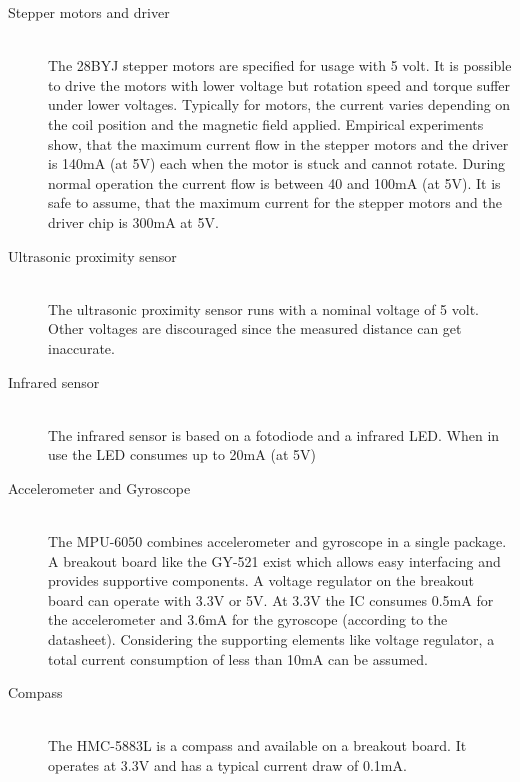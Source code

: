 \documentclass[11pt,a4paper]{article}
\begin{document}
\begin{description}
\item[Stepper motors and driver] \hfill \\ The 28BYJ stepper motors are specified for usage with 5 volt. It is possible to drive the motors with lower voltage but rotation speed and torque suffer under lower voltages. Typically for motors, the current varies depending on the coil position and the magnetic field applied. Empirical experiments show, that the maximum current flow in the stepper motors and the driver is 140mA (at 5V) each when the motor is stuck and cannot rotate. During normal operation the current flow is between 40 and 100mA (at 5V). It is safe to assume, that the maximum current for the stepper motors and the driver chip is 300mA at 5V.
\item[Ultrasonic proximity sensor] \hfill \\ The ultrasonic proximity sensor runs with a nominal voltage of 5 volt. Other voltages are discouraged since the measured distance can get inaccurate. 
\item[Infrared sensor] \hfill \\ The infrared sensor is based on a fotodiode and a infrared LED. When in use the LED consumes up to 20mA (at 5V) 
\item[Accelerometer and Gyroscope] \hfill \\ The MPU-6050 combines accelerometer and gyroscope in a single package. A breakout board like the GY-521 exist which allows easy interfacing and provides supportive components. A voltage regulator on the breakout board can operate with 3.3V or 5V. At 3.3V the IC consumes 0.5mA for the accelerometer and 3.6mA for the gyroscope (according to the datasheet). Considering the supporting elements like voltage regulator, a total current consumption of less than 10mA can be assumed.
\item[Compass] \hfill \\ The HMC-5883L is a compass and available on a breakout board. It operates at 3.3V and has a typical current draw of 0.1mA.

\end{description}

\nocite{*}
\printbibliography
{}
\end{document}
